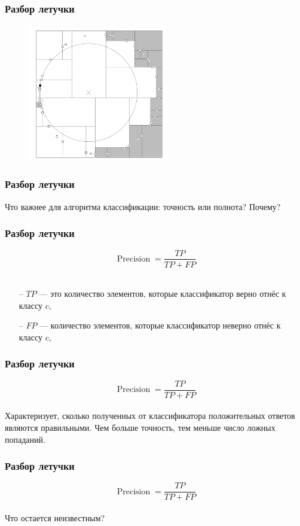 \documentclass[12pt]{beamer}
\begin{document}
\begin{frame}\frametitle{Разбор летучки}
\begin{figure}[htbp]
\centering
\includegraphics[height=170pt]{images/kd-nn2}  
\end{figure}
\end{frame}

\begin{frame}\frametitle{Разбор летучки}
Что важнее для алгоритма классификации: точность или полнота? Почему?
\end{frame}


\begin{frame}\frametitle{Разбор летучки}
$$\operatorname{Precision} = \frac{TP}{TP + FP}$$\\
\begin{itemize}
\item[--] $TP$ --- это количество элементов, которые классификатор верно отнёс к классу $c$,
\item[--] $FP$ --- количество элементов, которые классификатор неверно отнёс к классу $c$,
\end{itemize}
\end{frame}

\begin{frame}\frametitle{Разбор летучки}
$$\operatorname{Precision} = \frac{TP}{TP + FP}$$\\
\vspace{5mm}
Характеризует, сколько полученных от классификатора положительных ответов являются правильными. Чем больше точность, тем меньше число ложных попаданий.
\end{frame}

\begin{frame}\frametitle{Разбор летучки}
$$\operatorname{Precision} = \frac{TP}{TP + FP}$$\\
\vspace{5mm}
Что остается неизвестным?
\end{frame}
\end{document}
